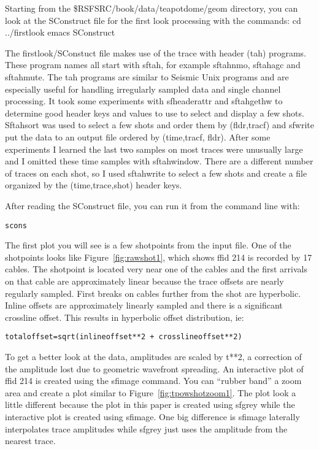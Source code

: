 Starting from the \$RSFSRC/book/data/teapotdome/geom directory, you can look at the SConstruct file for the first look processing with the commands:
cd ../firstlook
emacs SConstruct

The firstlook/SConstuct file makes use of the trace with header (tah) programs.  These program names all start with sftah, for example sftahnmo, sftahagc and sftahmute.  The tah programs are similar to Seismic Unix programs and are especially useful for handling irregularly sampled data and single channel processing.   It took some experiments with sfheaderattr and sftahgethw to determine good header keys and values to use to select and display a few shots.  Sftahsort was used to select a few shots and order them by (fldr,tracf) and sfwrite put the data to an output file ordered by (time,tracf, fldr).  After some experiments I learned the last two samples on most traces were unusually large and I omitted these time samples with sftahwindow.   There are a different number of traces on each shot, so I used sftahwrite to select a few shots and create a file organized by the (time,trace,shot) header keys. 

After reading the SConstruct file, you can run it from the command line with:
\begin{verbatim}   
scons
\end{verbatim}   

The first plot you will see is a few shotpoints from the input file.  One of the shotpoints looks like Figure~\ref{fig:rawshot1}, which shows ffid 214 is recorded by 17 cables.  The shotpoint is located very near one of the cables and the first arrivals on that cable are approximately linear because the trace offsets are nearly regularly sampled.  First breaks on cables further from the shot are hyperbolic.   Inline offsets are approximately linearly sampled and there is a significant crossline offset.  This results in hyperbolic offset distribution, ie:
\begin{verbatim}   
totaloffset=sqrt(inlineoffset**2 + crosslineoffset**2) 
\end{verbatim}   

To get a better look at the data, amplitudes are scaled by t**2, a correction of the amplitude lost due to geometric wavefront spreading.  An interactive plot of ffid 214 is created using the sfimage command.  You can “rubber band” a zoom area and create a plot similar to Figure~\ref{fig:tpowshotzoom1}.   The plot look a little different because the plot in this paper is created using sfgrey while the interactive plot is created using sfimage.  One big difference is sfimage laterally interpolates trace amplitudes while sfgrey just uses the amplitude from the nearest trace.

